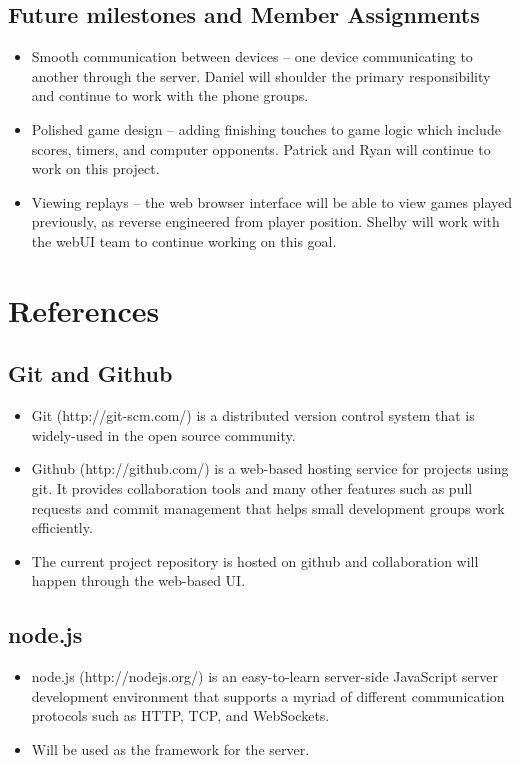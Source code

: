 \documentclass[letterpaper,12pt]{article}
\begin{document}
\subsection{Future milestones and Member Assignments}
\begin{itemize}
	\item Smooth communication between devices -- one device communicating to another through the server. Daniel will shoulder the primary responsibility and continue to work with the phone groups.
	\item Polished game design -- adding finishing touches to game logic which include scores, timers, and computer opponents. Patrick and Ryan will continue to work on this project. 
	\item Viewing replays -- the web browser interface will be able to view games played previously, as reverse engineered from player position. Shelby will work with the webUI team to continue working on this goal.
\end{itemize}

\section{References}
\subsection{Git and Github}
	\begin{itemize}
		\item Git (http://git-scm.com/) is a distributed version control system that is widely-used in the open source community.
		\item Github (http://github.com/) is a web-based hosting service for projects using git. It provides collaboration tools and many other features such as pull requests and commit management that helps small development groups work efficiently.
		\item The current project repository is hosted on github and collaboration will happen through the web-based UI.
	\end{itemize}
\subsection{node.js}
	\begin{itemize}
		\item node.js (http://nodejs.org/) is an easy-to-learn server-side JavaScript server development environment that supports a myriad of different communication protocols such as HTTP, TCP, and WebSockets.
		\item Will be used as the framework for the server.
	\end{itemize}
\end{document}
